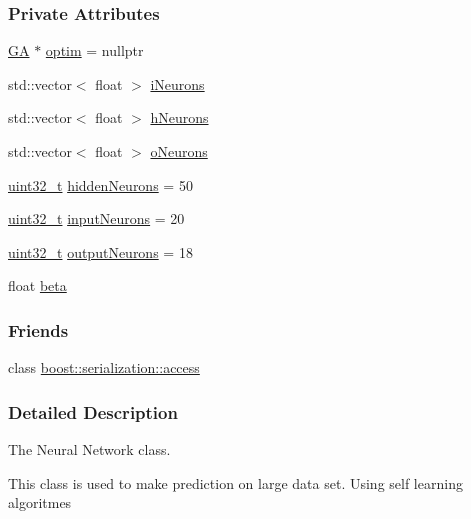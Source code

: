 \subsubsection*{Private Attributes}
\begin{DoxyCompactItemize}
\item 
\hyperlink{class_soil_math_1_1_g_a}{G\+A} $\ast$ \hyperlink{class_soil_math_1_1_n_n_a88b760a795d84bf6e1c99c7620200c43}{optim} = nullptr
\item 
std\+::vector$<$ float $>$ \hyperlink{class_soil_math_1_1_n_n_aa5a6a6014722338fb8af2f79d6187998}{i\+Neurons}
\item 
std\+::vector$<$ float $>$ \hyperlink{class_soil_math_1_1_n_n_a459bde01ce33e0b27803cbe4a3b114b4}{h\+Neurons}
\item 
std\+::vector$<$ float $>$ \hyperlink{class_soil_math_1_1_n_n_a50a52b41982f6845dc5294f17607774b}{o\+Neurons}
\item 
\hyperlink{_soil_math_types_8h_a435d1572bf3f880d55459d9805097f62}{uint32\+\_\+t} \hyperlink{class_soil_math_1_1_n_n_aedf4b2ddaae281d83e666c308e5d67c4}{hidden\+Neurons} = 50
\item 
\hyperlink{_soil_math_types_8h_a435d1572bf3f880d55459d9805097f62}{uint32\+\_\+t} \hyperlink{class_soil_math_1_1_n_n_a51723ae01e9b0a95c9aa6ac4f4c569fc}{input\+Neurons} = 20
\item 
\hyperlink{_soil_math_types_8h_a435d1572bf3f880d55459d9805097f62}{uint32\+\_\+t} \hyperlink{class_soil_math_1_1_n_n_a65ce6c65168fbe7051c25dccf4bf2b0c}{output\+Neurons} = 18
\item 
float \hyperlink{class_soil_math_1_1_n_n_a4bb773955d78fa6f064b39a9149b78c8}{beta}
\end{DoxyCompactItemize}
\subsubsection*{Friends}
\begin{DoxyCompactItemize}
\item 
class \hyperlink{class_soil_math_1_1_n_n_ac98d07dd8f7b70e16ccb9a01abf56b9c}{boost\+::serialization\+::access}
\end{DoxyCompactItemize}


\subsubsection{Detailed Description}
The Neural Network class. 

This class is used to make prediction on large data set. Using self learning algoritmes 

